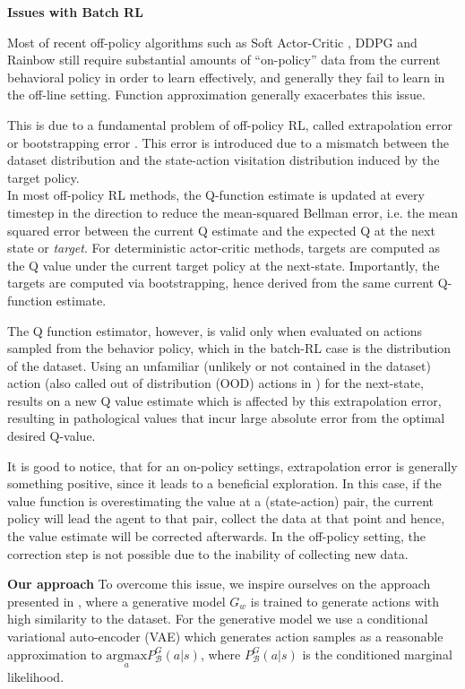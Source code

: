 \textbf{Issues with Batch RL}

Most of recent off-policy algorithms such as Soft Actor-Critic \citep{Haarnoja2018}, 
DDPG \citep{Lillicrap2016} and Rainbow \citep{Hessel2018}  still require substantial amounts
of “on-policy” data from the current behavioral policy in order to learn effectively, 
and generally they fail to learn in the off-line setting. Function approximation generally exacerbates this issue.


This is due to a fundamental problem of off-policy RL, called extrapolation error \citep{Fujimoto2019} or 
bootstrapping error \citep{Kumar2019}. This error is introduced due to a mismatch
between the dataset distribution and the state-action visitation distribution induced by the
target policy.\\
In most off-policy RL methods, the Q-function estimate is updated at every timestep 
in the direction to reduce the mean-squared Bellman error, i.e. the 
mean squared error between the current Q estimate and
the expected Q at the next state or \textit{target}.
For deterministic actor-critic methods, targets are computed as the Q value under the current
target policy at the next-state.
Importantly, the targets are computed via bootstrapping, hence derived from the same current
Q-function estimate.

The Q function estimator, however, is valid only when evaluated on actions sampled
from the behavior policy, which in the batch-RL case is the distribution of the dataset.
Using an unfamiliar (unlikely or not contained in the dataset) action
(also called out of distribution (OOD) actions in \citep{Kumar2019}) for the next-state,
results on a new Q value estimate which is affected by this extrapolation error,
resulting in pathological values that incur large absolute error from the optimal desired Q-value.

It is good to notice, that for an on-policy settings, extrapolation error is generally something positive, since it
leads to a beneficial exploration. In this case, if the value function is overestimating the value at
a (state-action) pair, the current policy will lead the agent to that pair, collect the data at that point
and hence, the value estimate will be corrected afterwards.
In the off-policy setting, the correction step is not possible due to the inability of collecting new data.



\textbf{Our approach}
To overcome this issue, we inspire ourselves on the approach presented in \citet{Fujimoto2019}, where a
generative model $G_w$ is trained to generate actions with high similarity to the dataset.
For the generative model we use a conditional variational auto-encoder (VAE) \cite{Kingma2014} which
generates action samples as a reasonable approximation to
$\underset{a}{\text{argmax}}  P _\mathcal{B}^G(a|s)$, where $P _\mathcal{B}^G(a|s)$ is the 
conditioned marginal likelihood.

